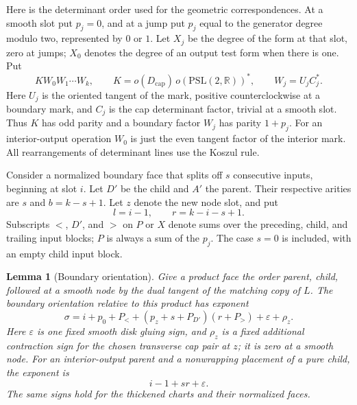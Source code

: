 \documentclass[11pt]{article}
\newtheorem{lemma}[theorem]{Lemma}
\theoremstyle{definition}
\theoremstyle{remark}
\newcommand{\R}{\mathbb R}
\numberwithin{equation}{section}
\begin{document}
Here is the determinant order used for the geometric correspondences.
At a smooth slot put $p_j=0$, and at a jump put $p_j$ equal to the
generator degree modulo two, represented by $0$ or $1$.  Let $X_j$ be
the degree of the form at that slot, zero at jumps; $X_0$ denotes the
degree of an output test form when there is one.  Put
\begin{equation}
 \label{obs:determinant-order}
 K W_0W_1\cdots W_k,\qquad
 K=o(D_{\mathrm{cap}})\,o(\mathrm{PSL}(2,\R))^*,\qquad
 W_j=U_jC_j^*.
\end{equation}
Here $U_j$ is the oriented tangent of the mark, positive
counterclockwise at a boundary mark, and $C_j$ is the cap determinant
factor, trivial at a smooth slot.  Thus $K$ has odd parity and a
boundary factor $W_j$ has parity $1+p_j$.  For an interior-output
operation $W_0$ is just the even tangent factor of the interior mark.
All rearrangements of determinant lines use the Koszul rule.

Consider a normalized boundary face that splits off $s$ consecutive
inputs, beginning at slot $i$.  Let $D'$ be the child and $A'$ the
parent.  Their respective arities are $s$ and
$b=k-s+1$.  Let $z$ denote the new node slot, and put
\[
 l=i-1,\qquad r=k-i-s+1.
\]
Subscripts $<$, $D'$, and $>$ on $P$ or $X$ denote sums over the
preceding, child, and trailing input blocks; $P$ is always a sum of
the $p_j$.  The case $s=0$ is included, with an empty child input block.

\begin{lemma}[Boundary orientation]\label{obs:boundary-sign}
Give a product face the order parent, child, followed at a smooth node
by the dual tangent of the matching copy of $L$.  The boundary
orientation relative to this product has exponent
\begin{equation}
 \label{obs:boundary-exponent}
 \sigma=i+p_0+P_<+
       (p_z+s+P_{D'})(r+P_>)+\varepsilon+\rho_z.
\end{equation}
Here $\varepsilon$ is one fixed smooth disk gluing sign, and $\rho_z$
is a fixed additional contraction sign for the chosen transverse cap
pair at $z$; it is zero at a smooth node.  For an interior-output
parent and a nonwrapping placement of a pure child, the exponent is
\begin{equation}
 \label{obs:p-boundary-exponent}
 i-1+sr+\varepsilon.
\end{equation}
The same signs hold for the thickened charts and their normalized
faces.
\end{lemma}
\end{document}
